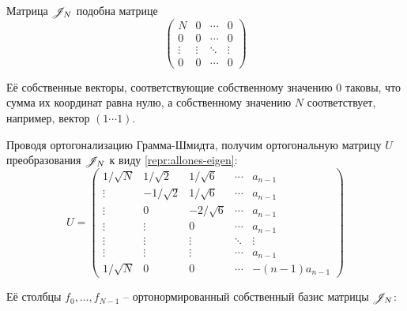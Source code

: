 \begin{lemma}
    Матрица \( \mathscr{J}_{N} \) подобна матрице
    \begin{equation}\label{repr:allones-eigen}
        \begin{pmatrix}
            N       & 0      & \cdots & 0 \\
            0       & 0      & \cdots & 0 \\
            \vdots  & \vdots & \ddots & \vdots  \\
            0       & 0      & \cdots & 0
        \end{pmatrix}
    \end{equation}

    Её собственные векторы, соответствующие собственному значению \( 0 \)
    таковы, что сумма их координат равна нулю,
    а собственному значению \( N \) соответствует, например,
    вектор \( \left(1\cdots 1\right) \).

    Проводя ортогонализацию Грамма-Шмидта,
    получим ортогональную матрицу \( U \) преобразования \( \mathscr{J}_{N} \)
    к виду \eqref{repr:allones-eigen}:
    \begin{equation}\label{eq:diagtransform}
    U =
    \begin{pmatrix}
        1/\sqrt N &  1/\sqrt2 & 1/\sqrt6   & \cdots & a_{n-1} \\
        \vdots    & -1/\sqrt2 & 1/\sqrt6   & \cdots & a_{n-1} \\
        \vdots    & 0         & -2/\sqrt6  & \cdots & a_{n-1} \\
        \vdots    & \vdots    & 0          & \cdots & a_{n-1} \\
        \vdots    & \vdots    & \vdots     & \ddots & \vdots  \\
        \vdots    & \vdots    & \vdots     & \cdots & a_{n-1} \\
        1/\sqrt N & 0         & 0          & \cdots & -(n-1)a_{n-1}
        \end{pmatrix}
        \end{equation}

        \begin{minipage}{\textwidth}
            Её столбцы \( f_0, \ldots, f_{N-1} \) -- ортонормированный собственный базис матрицы \( \mathscr{J}_{N} \):


\end{minipage}
\end{lemma}
